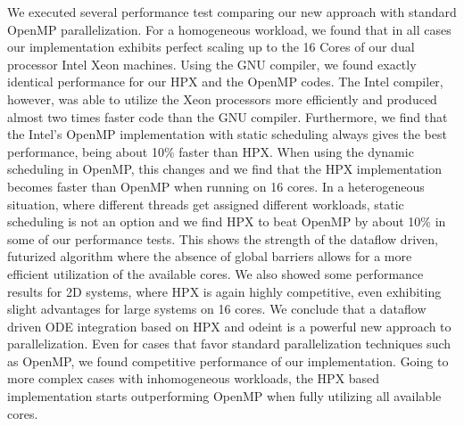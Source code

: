 \documentclass[10pt]{elsarticle}
\begin{document}
We executed several performance test comparing our new approach with standard OpenMP parallelization.
For a homogeneous workload, we found that in all cases our implementation exhibits perfect scaling up to the 16 Cores of our dual processor Intel Xeon machines.
Using the GNU compiler, we found exactly identical performance for our HPX and the OpenMP codes.
The Intel compiler, however, was able to utilize the Xeon processors more efficiently and produced almost two times faster code than the GNU compiler.
Furthermore, we find that the Intel's OpenMP implementation with static scheduling always gives the best performance, being about 10\% faster than HPX.
When using the dynamic scheduling in OpenMP, this changes and we find that the HPX implementation becomes faster than OpenMP when running on 16 cores.
In a heterogeneous situation, where different threads get assigned different workloads, static scheduling is not an option and we find HPX to beat OpenMP by about 10\% in some of our performance tests.
This shows the strength of the dataflow driven, futurized algorithm where the absence of global barriers allows for a more efficient utilization of the available cores.
We also showed some performance results for 2D systems, where HPX is again highly competitive, even exhibiting slight advantages for large systems on 16 cores.
We conclude that a dataflow driven ODE integration based on HPX and odeint is a powerful new approach to parallelization.
Even for cases that favor standard parallelization techniques such as OpenMP, we found competitive performance of our implementation.
Going to more complex cases with inhomogeneous workloads, the HPX based implementation starts outperforming OpenMP when fully utilizing all available cores.



\end{document}

